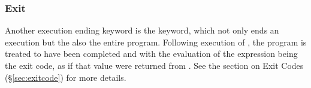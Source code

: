 \subsubsection{Exit}

Another execution ending keyword is the  keyword, which not only ends
an execution but the also the entire program. Following execution of , the
program is treated to have been completed and with the evaluation of the expression
being the exit code, as if that value were returned from . See the section
on Exit Codes (\S\ref{sec:exitcode}) for more details.

\begin{bnf*}
\end{bnf*}

\begin{prooftree}
\end{prooftree}
